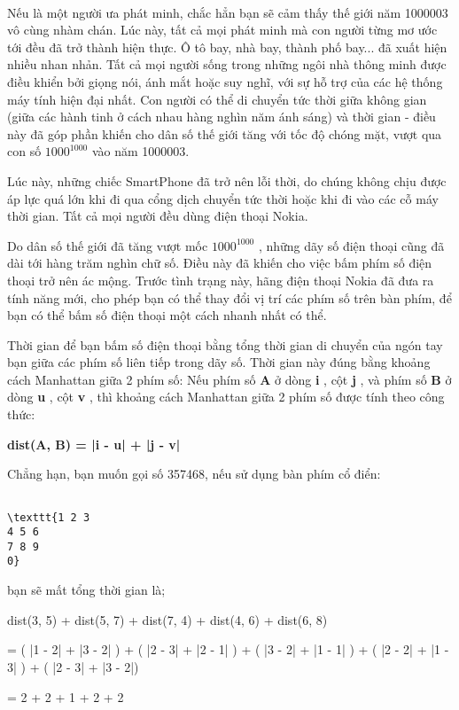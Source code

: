 

 

Nếu là một người ưa phát minh, chắc hẳn bạn sẽ cảm thấy thế giới năm 1000003 vô cùng nhàm chán. Lúc này, tất cả mọi phát minh mà con người từng mơ ước tới đều đã trở thành hiện thực. Ô tô bay, nhà bay, thành phố bay... đã xuất hiện nhiều nhan nhản. Tất cả mọi người sống trong những ngôi nhà thông minh được điều khiển bởi giọng nói, ánh mắt hoặc suy nghĩ, với sự hỗ trợ của các hệ thống máy tính hiện đại nhất. Con người có thể di chuyển tức thời giữa không gian (giữa các hành tinh ở cách nhau hàng nghìn năm ánh sáng) và thời gian - điều này đã góp phần khiến cho dân số thế giới tăng với tốc độ chóng mặt, vượt qua con số $1000^{1000}$ vào năm 1000003.

Lúc này, những chiếc SmartPhone đã trở nên lỗi thời, do chúng không chịu được áp lực quá lớn khi đi qua cổng dịch chuyển tức thời hoặc khi đi vào các cỗ máy thời gian. Tất cả mọi người đều dùng điện thoại Nokia.

Do dân số thế giới đã tăng vượt mốc $1000^{1000}$ , những dãy số điện thoại cũng đã dài tới hàng trăm nghìn chữ số. Điều này đã khiến cho việc bấm phím số điện thoại trở nên ác mộng. Trước tình trạng này, hãng điện thoại Nokia đã đưa ra tính năng mới, cho phép bạn có thể thay đổi vị trí các phím số trên bàn phím, để bạn có thể bấm số điện thoại một cách nhanh nhất có thể.

Thời gian để bạn bấm số điện thoại bằng tổng thời gian di chuyển của ngón tay bạn giữa các phím số liên tiếp trong dãy số. Thời gian này đúng bằng khoảng cách Manhattan giữa 2 phím số: Nếu phím số \textbf{ A } ở dòng \textbf{ i } , cột \textbf{ j } , và phím số \textbf{ B } ở dòng \textbf{ u } , cột \textbf{ v } , thì khoảng cách Manhattan giữa 2 phím số được tính theo công thức:

\textbf{dist(A, B) = |i - u| + |j - v| }

Chẳng hạn, bạn muốn gọi số 357468, nếu sử dụng bàn phím cổ điển:
\begin{verbatim}

\texttt{1 2 3
4 5 6
7 8 9
0}\end{verbatim}

bạn sẽ mất tổng thời gian là;

dist(3, 5) + dist(5, 7) + dist(7, 4) + dist(4, 6) + dist(6, 8)

= ( |1 - 2| + |3 - 2| ) + ( |2 - 3| + |2 - 1| ) + ( |3 - 2| + |1 - 1| ) + ( |2 - 2| + |1 - 3| ) + ( |2 - 3| + |3 - 2|)

= 2 + 2 + 1 + 2 + 2

